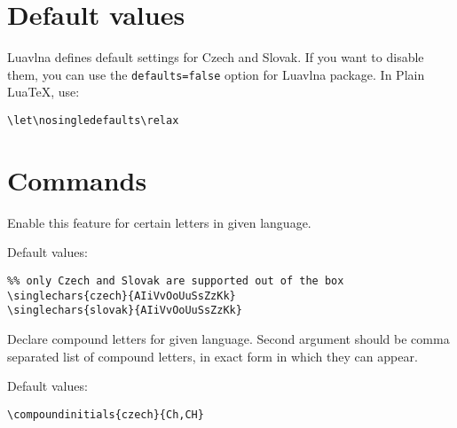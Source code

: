 \documentclass[12pt]{ltxdoc}
\newenvironment{mycode}{
	\medskip%
	\parindent=0pt%
}{\medskip}
\begin{document}
\section{Default values}

Luavlna defines default settings for Czech and Slovak. If you want to disable them,
you can use the \texttt{defaults=false} option for Luavlna package. In Plain Lua\TeX{},
use:

\begin{mycode}
\begin{verbatim}
\let\nosingledefaults\relax

\end{verbatim}
\end{mycode}

\section{Commands}

\begin{mycode}
\cmd{\singlechars} 
\end{mycode}

Enable this feature for certain letters in given language. 

Default values:

\begin{mycode}
\begin{verbatim}
%% only Czech and Slovak are supported out of the box
\singlechars{czech}{AIiVvOoUuSsZzKk}
\singlechars{slovak}{AIiVvOoUuSsZzKk}
\end{verbatim}
\end{mycode}



\begin{mycode}
\cmd{\compoundinitials}
\end{mycode}

Declare compound letters for given language. Second argument should be comma 
separated list of compound letters, in exact form in which they can appear.

Default values:

\begin{mycode}
\begin{verbatim}
\compoundinitials{czech}{Ch,CH}
\end{verbatim}
\end{mycode}
\end{document}
